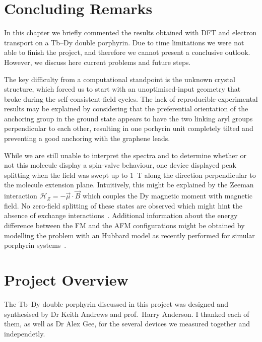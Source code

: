 \section{Concluding Remarks}

In this chapter we briefly commented the results obtained with \gls{DFT} and electron transport on a Tb--Dy double porphyrin.
Due to time limitations we were not able to finish the project, and therefore we cannot present a conclusive outlook. However, we discuss here current problems and future steps.

The key difficulty from a computational standpoint is the unknown crystal structure, which forced us to start with an unoptimised-input geometry that broke during the self-consistent-field cycles. The lack of reproducible-experimental results may be explained by considering that the preferential orientation of the anchoring group in the ground state appears to have the two linking aryl groups perpendicular to each other, resulting in one porhyrin unit completely tilted and preventing a good anchoring with the graphene leads.

While we are still unable to interpret the spectra and to determine whether or not this molecule display a spin-valve behaviour, one device displayed peak splitting when the field was swept up to \SI{1}{\tesla} along the direction perpendicular to the molecule extension plane.  Intuitively, this might be explained by the Zeeman interaction $\mathcal{H}_Z = -\vec{\mu}\cdot\vec{B}$ which couples the Dy magnetic moment with magnetic field. No zero-field splitting of these states are observed which might hint the absence of exchange interactions~\cite{pei2022exchange}. Additional information about the energy difference between the FM and the AFM configurations might be obtained by modelling the problem with an Hubbard model as recently performed for simular porphyrin systems~\cite{thomas2021charge}.


\section{Project Overview}

The Tb--Dy double porphyrin discussed in this project was designed and synthesised by Dr Keith Andrews and prof.\ Harry Anderson. I thanked each of them, as well as Dr Alex Gee, for the several devices we measured together and independetly.

